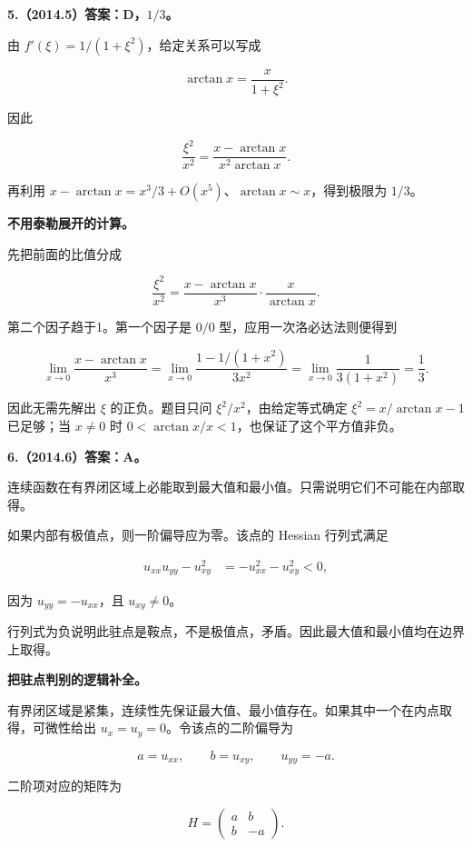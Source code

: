 \documentclass[UTF8,11pt,fontset=windows]{ctexart}
\begin{document}
\textbf{5.（2014.5）答案：D，$1/3$。}

由 $f'(\xi)=1/(1+\xi^2)$，给定关系可以写成

$$
\arctan x=\frac{x}{1+\xi^2}.
$$

因此

$$
\frac{\xi^2}{x^2}
=\frac{x-\arctan x}{x^2\arctan x}.
$$

再利用 $x-\arctan x=x^3/3+O(x^5)$、$\arctan x\sim x$，得到极限为 $1/3$。

\textbf{不用泰勒展开的计算。}

先把前面的比值分成

$$
\frac{\xi^2}{x^2}
=\frac{x-\arctan x}{x^3}\cdot\frac{x}{\arctan x}.
$$

第二个因子趋于1。第一个因子是 $0/0$ 型，应用一次洛必达法则便得到

$$
\lim_{x\to0}\frac{x-\arctan x}{x^3}
=\lim_{x\to0}\frac{1-1/(1+x^2)}{3x^2}
=\lim_{x\to0}\frac1{3(1+x^2)}=\frac13.
$$

因此无需先解出 $\xi$ 的正负。题目只问 $\xi^2/x^2$，由给定等式确定 $\xi^2=x/\arctan x-1$ 已足够；当 $x\ne0$ 时 $0<\arctan x/x<1$，也保证了这个平方值非负。

\clearpage

\textbf{6.（2014.6）答案：A。}

连续函数在有界闭区域上必能取到最大值和最小值。只需说明它们不可能在内部取得。

如果内部有极值点，则一阶偏导应为零。该点的 Hessian 行列式满足

$$
\begin{aligned}
u_{xx}u_{yy}-u_{xy}^2
&=-u_{xx}^2-u_{xy}^2<0,
\end{aligned}
$$

因为 $u_{yy}=-u_{xx}$，且 $u_{xy}\ne0$。

行列式为负说明此驻点是鞍点，不是极值点，矛盾。因此最大值和最小值均在边界上取得。

\textbf{把驻点判别的逻辑补全。}

有界闭区域是紧集，连续性先保证最大值、最小值存在。如果其中一个在内点取得，可微性给出 $u_x=u_y=0$。令该点的二阶偏导为

$$
a=u_{xx},\qquad b=u_{xy},\qquad u_{yy}=-a.
$$

二阶项对应的矩阵为

$$
H=\begin{pmatrix}a&b\\b&-a\end{pmatrix}.
$$
\end{document}
